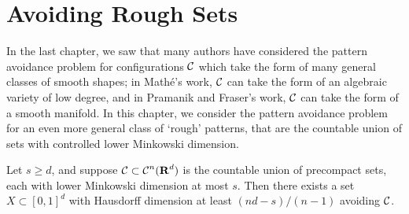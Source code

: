 
\chapter{Avoiding Rough Sets}
\label{ch:RoughSets}

In the last chapter, we saw that many authors have considered the pattern avoidance problem for configurations $\operatorname{\mathcal{C}}$ which take the form of many general classes of smooth shapes; in Math\'{e}'s work, $\operatorname{\mathcal{C}}$ can take the form of an algebraic variety of low degree, and in Pramanik and Fraser's work, $\operatorname{\mathcal{C}}$ can take the form of a smooth manifold. In this chapter, we consider the pattern avoidance problem for an even more general class of `rough' patterns, that are the countable union of sets with controlled lower Minkowski dimension.
%
\begin{theorem}\label{mainTheorem}
	Let $s \geq d$, and suppose $\operatorname{\mathcal{C}} \subset \operatorname{\mathcal{C}}^n(\operatorname{\mathbf{R}}^d)$ is the countable union of precompact sets, each with lower Minkowski dimension at most $s$. Then there exists a set $X \subset [0,1]^d$ with Hausdorff dimension at least $(nd - s)/(n-1)$ avoiding $\operatorname{\mathcal{C}}$.
\end{theorem}

